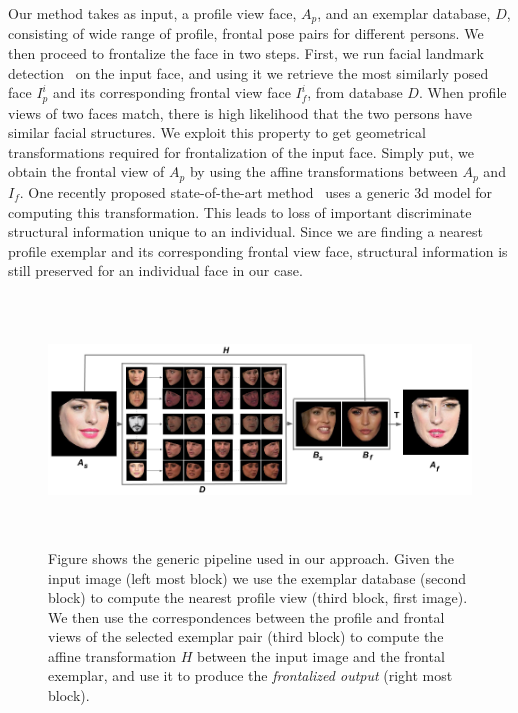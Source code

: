 Our method takes as input, a profile view face, $A_p$, and an exemplar database, $D$, consisting of
wide range of profile, frontal pose pairs for different persons. We then proceed to frontalize
the face in two steps. First, we run facial landmark
detection~\cite{kazemi2014one} on the input face, and using it we retrieve the most similarly posed face 
$I^i_p$ and its corresponding frontal view face $I^i_f$, from
database $D$. When profile views of two faces match, there is high likelihood that the two persons
have similar facial structures. We exploit this property to get geometrical transformations required
for frontalization of the input face.
Simply put, we obtain the frontal view of $A_p$ by using the affine transformations between $A_p$
and $I_f$. One recently proposed state-of-the-art method~\cite{DBLP:journals/corr/HassnerHPE14} uses a generic {\sc 3d}
model for computing this transformation. This leads to loss of important discriminate structural information
unique to an individual. Since we are finding a nearest profile exemplar and its corresponding
frontal view face, structural information is still preserved for an individual face in our case.
                 
\begin{figure}
\includegraphics[width =18cm,height=6.6cm]{front/figures/Method_Pipeline.png}
\caption{Figure shows the generic pipeline used in our approach. Given the input image (left most
block) we use the exemplar database (second block) to compute the nearest profile view (third block,
first image). We then use the correspondences between the profile and frontal views of the
selected exemplar pair (third block) to compute the affine transformation $H$ between the input
image and the frontal exemplar, and use it to produce the \emph{frontalized output} (right most block).}
\label{fig:method_pipeline}
\end{figure}

